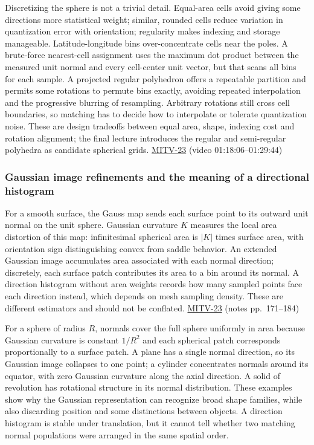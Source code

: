 Discretizing the sphere is not a trivial detail. Equal-area cells avoid giving some directions more statistical weight; similar, rounded cells reduce variation in quantization error with orientation; regularity makes indexing and storage manageable. Latitude-longitude bins over-concentrate cells near the poles. A brute-force nearest-cell assignment uses the maximum dot product between the measured unit normal and every cell-center unit vector, but that scans all bins for each sample. A projected regular polyhedron offers a repeatable partition and permits some rotations to permute bins exactly, avoiding repeated interpolation and the progressive blurring of resampling. Arbitrary rotations still cross cell boundaries, so matching has to decide how to interpolate or tolerate quantization noise. These are design tradeoffs between equal area, shape, indexing cost and rotation alignment; the final lecture introduces the regular and semi-regular polyhedra as candidate spherical grids. \hyperref[04-visual-computing-ii-ch036]{MITV-23} (video 01:18:06--01:29:44)

\subsubsection{Gaussian image refinements and the meaning of a directional histogram}\label{gaussian-image-refinements-and-the-meaning-of-a-directional-histogram}

For a smooth surface, the Gauss map sends each surface point to its outward unit normal on the unit sphere. Gaussian curvature \(K\) measures the local area distortion of this map: infinitesimal spherical area is \(|K|\) times surface area, with orientation sign distinguishing convex from saddle behavior. An extended Gaussian image accumulates area associated with each normal direction; discretely, each surface patch contributes its area to a bin around its normal. A direction histogram without area weights records how many sampled points face each direction instead, which depends on mesh sampling density. These are different estimators and should not be conflated. \hyperref[04-visual-computing-ii-ch036]{MITV-23} (notes pp.~171--184)

For a sphere of radius \(R\), normals cover the full sphere uniformly in area because Gaussian curvature is constant \(1/R^2\) and each spherical patch corresponds proportionally to a surface patch. A plane has a single normal direction, so its Gaussian image collapses to one point; a cylinder concentrates normals around its equator, with zero Gaussian curvature along the axial direction. A solid of revolution has rotational structure in its normal distribution. These examples show why the Gaussian representation can recognize broad shape families, while also discarding position and some distinctions between objects. A direction histogram is stable under translation, but it cannot tell whether two matching normal populations were arranged in the same spatial order.

